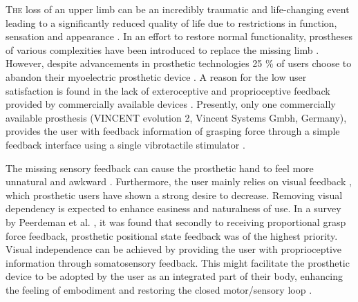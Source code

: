 

\lettrine{T}{he} loss of an upper limb can be an incredibly traumatic and life-changing event leading to a significantly reduced quality of life due to restrictions in function, sensation and appearance \cite{Schofield2014,Ostlie2011}. 
In an effort to restore normal functionality, prostheses of various complexities have been introduced to replace the missing limb \cite{Geethanjali2016}. However, despite advancements in prosthetic technologies 25 \% of users choose to abandon their myoelectric prosthetic device \cite{Biddiss2007a}. A reason for the low user satisfaction is found in the lack of exteroceptive and proprioceptive feedback provided by commercially available devices \cite{Schofield2014,Peerdeman2011}. Presently, only one commercially available prosthesis (VINCENT evolution 2, Vincent Systems Gmbh, Germany), provides the user with feedback information of grasping force through a simple feedback interface using a single vibrotactile stimulator \cite{Systems2005}. 
    
%
The missing sensory feedback can cause the prosthetic hand to feel more unnatural and awkward \cite{Pamungkas2015}. Furthermore, the user mainly relies on visual feedback \cite{Pamungkas2015,Stephens-Fripp2018}, which prosthetic users have shown a strong desire to decrease. Removing visual dependency is expected to enhance easiness and naturalness of use. \cite{Atkins1996}
In a survey by Peerdeman et al. \cite{Peerdeman2011}, it was found that secondly to receiving proportional grasp force feedback, prosthetic positional state feedback was of the highest priority. Visual independence can be achieved by providing the user with proprioceptive information through somatosensory feedback. This might facilitate the prosthetic device to be adopted by the user as an integrated part of their body, enhancing the feeling of embodiment and restoring the closed motor/sensory loop \cite{Stephens-Fripp2018,Xu2016,Strbac2016,Geng2012}. 

